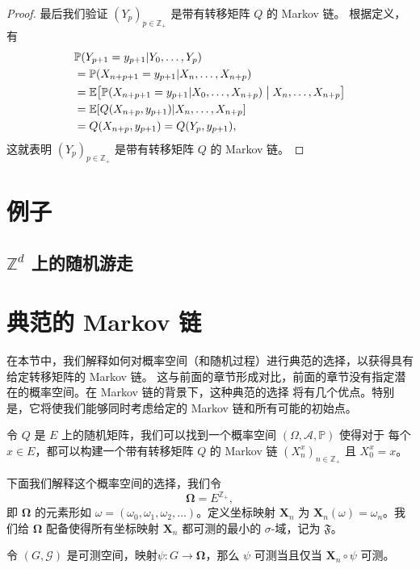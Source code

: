 \documentclass[fontset=none]{Notes}
\newcommand{\mat}[1]{\mathbold{#1}}
\begin{document}
\begin{proof}
  最后我们验证 $(Y_p)_{p\in \mathbb{Z}_+}$ 是带有转移矩阵 $Q$ 的 Markov 链。
  根据定义，有
  \begin{align*}
    &\mathbb{P}(Y_{p+1}=y_{p+1}|Y_0,\dots,Y_p)\\
    &=\mathbb{P}(X_{n+p+1}=y_{p+1}|X_n,\dots,X_{n+p})\\
    &=\mathbb{E}\bigl[\mathbb{P}(X_{n+p+1}=y_{p+1}|X_0,\dots,X_{n+p})\bigm| X_n,\dots,X_{n+p}\bigr]\\
    &=\mathbb{E}[Q(X_{n+p},y_{p+1})|X_n,\dots,X_{n+p}]\\
    &=Q(X_{n+p},y_{p+1})=Q(Y_p,y_{p+1}),
  \end{align*}
  这就表明 $(Y_p)_{p\in \mathbb{Z}_+}$ 是带有转移矩阵 $Q$ 的 Markov 链。
\end{proof}


\section{例子}

\subsection{$\mathbb{Z}^d$ 上的随机游走}


\section{典范的 Markov 链}

在本节中，我们解释如何对概率空间（和随机过程）进行典范的选择，以获得具有给定转移矩阵的 Markov 链。
这与前面的章节形成对比，前面的章节没有指定潜在的概率空间。在 Markov 链的背景下，这种典范的选择
将有几个优点。特别是，它将使我们能够同时考虑给定的 Markov 链和所有可能的初始点。

\begin{proposition}
  令 $Q$ 是 $E$ 上的随机矩阵，我们可以找到一个概率空间 $(\Omega,\mathcal{A},\mathbb{P})$ 使得对于
  每个 $x\in E$，都可以构建一个带有转移矩阵 $Q$ 的 Markov 链 $(X_n^x)_{n\in \mathbb{Z}_+}$ 且
  $X_0^x=x$。
\end{proposition}

下面我们解释这个概率空间的选择，我们令
\[
  \mat\Omega=E^{\mathbb{Z}_+},
\]
即 $\mat\Omega$ 的元素形如 $\omega=(\omega_0,\omega_1,\omega_2,\dots)$。定义坐标映射
$\mat X_n$ 为 $\mat X_n(\omega)=\omega_n$。我们给 $\mat\Omega$ 配备使得所有坐标映射
$\mat X_n$ 都可测的最小的 $\sigma$-域，记为 $\mathfrak{F}$。

\begin{lemma}
  令 $(G,\mathcal{G})$ 是可测空间，映射$\psi:G\to \mat\Omega$，那么
  $\psi$ 可测当且仅当 $\mat X_n\circ\psi$ 可测。
\end{lemma}
\end{document}
